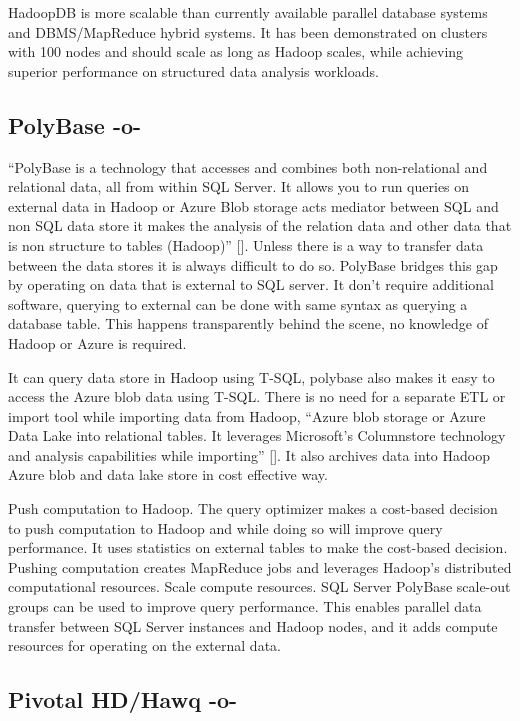  HadoopDB is more scalable than currently available parallel database
 systems and DBMS/MapReduce hybrid systems. It has been demonstrated
 on clusters with 100 nodes and should scale as long as Hadoop scales,
 while achieving superior performance on structured data analysis
 workloads.
     
\subsection{PolyBase -o-}

``PolyBase is a technology that accesses and combines both
non-relational and relational data, all from within SQL Server. It
allows you to run queries on external data in Hadoop or Azure Blob
storage acts mediator between SQL and non SQL data store it makes the
analysis of the relation data and other data that is non structure to
tables (Hadoop)'' [\cite{www-polybase}]. Unless there is a way to
transfer data between the data stores it is always difficult to do so.
PolyBase bridges this gap by operating on data that is external to SQL
server. It don't require additional software, querying to external can
be done with same syntax as querying a database table.  This happens
transparently behind the scene, no knowledge of Hadoop or Azure is
required.

It can query data store in Hadoop using T-SQL, polybase also makes it
easy to access the Azure blob data using T-SQL. There is no need for a
separate ETL or import tool while importing data from Hadoop, ``Azure
blob storage or Azure Data Lake into relational tables. It leverages
Microsoft's Columnstore technology and analysis capabilities while
importing'' [\cite{www-polybase}]. It also archives data into Hadoop
Azure blob and data lake store in cost effective way.

Push computation to Hadoop. The query optimizer makes a cost-based
decision to push computation to Hadoop and while doing so will improve
query performance. It uses statistics on external tables to make the
cost-based decision. Pushing computation creates MapReduce jobs and
leverages Hadoop's distributed computational resources. Scale compute
resources. SQL Server PolyBase scale-out groups can be used to improve
query performance. This enables parallel data transfer between SQL
Server instances and Hadoop nodes, and it adds compute resources for
operating on the external data.




\subsection{Pivotal HD/Hawq -o-}

